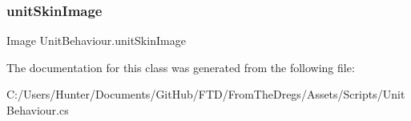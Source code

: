 \subsubsection{\texorpdfstring{unitSkinImage}{unitSkinImage}}
{\footnotesize\ttfamily Image Unit\+Behaviour.\+unit\+Skin\+Image\hspace{0.3cm}{\ttfamily [get]}}



The documentation for this class was generated from the following file\+:\begin{DoxyCompactItemize}
\item 
C\+:/\+Users/\+Hunter/\+Documents/\+Git\+Hub/\+F\+T\+D/\+From\+The\+Dregs/\+Assets/\+Scripts/Unit\+Behaviour.\+cs\end{DoxyCompactItemize}
